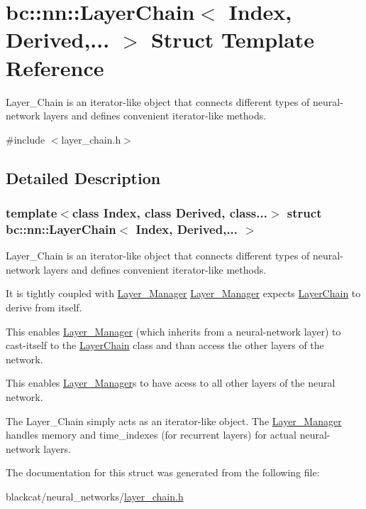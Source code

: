 \hypertarget{structbc_1_1nn_1_1LayerChain}{}\section{bc\+:\+:nn\+:\+:Layer\+Chain$<$ Index, Derived,... $>$ Struct Template Reference}
\label{structbc_1_1nn_1_1LayerChain}


Layer\+\_\+\+Chain is an iterator-\/like object that connects different types of neural-\/network layers and defines convenient iterator-\/like methods.  




{\ttfamily \#include $<$layer\+\_\+chain.\+h$>$}



\subsection{Detailed Description}
\subsubsection*{template$<$class Index, class Derived, class...$>$\newline
struct bc\+::nn\+::\+Layer\+Chain$<$ Index, Derived,... $>$}

Layer\+\_\+\+Chain is an iterator-\/like object that connects different types of neural-\/network layers and defines convenient iterator-\/like methods. 

It is tightly coupled with \hyperlink{structbc_1_1nn_1_1Layer__Manager}{Layer\+\_\+\+Manager} \hyperlink{structbc_1_1nn_1_1Layer__Manager}{Layer\+\_\+\+Manager} expects \hyperlink{structbc_1_1nn_1_1LayerChain}{Layer\+Chain} to derive from itself.

This enables \hyperlink{structbc_1_1nn_1_1Layer__Manager}{Layer\+\_\+\+Manager} (which inherits from a neural-\/network layer) to cast-\/itself to the \hyperlink{structbc_1_1nn_1_1LayerChain}{Layer\+Chain} class and than access the other layers of the network.

This enables \hyperlink{structbc_1_1nn_1_1Layer__Manager}{Layer\+\_\+\+Manager}\textquotesingle{}s to have acess to all other layer\textquotesingle{}s of the neural network.

The Layer\+\_\+\+Chain simply acts as an iterator-\/like object. The \hyperlink{structbc_1_1nn_1_1Layer__Manager}{Layer\+\_\+\+Manager} handles memory and time\+\_\+indexes (for recurrent layers) for actual neural-\/network layers. 

The documentation for this struct was generated from the following file\+:\begin{DoxyCompactItemize}
\item 
blackcat/neural\+\_\+networks/\hyperlink{layer__chain_8h}{layer\+\_\+chain.\+h}\end{DoxyCompactItemize}
